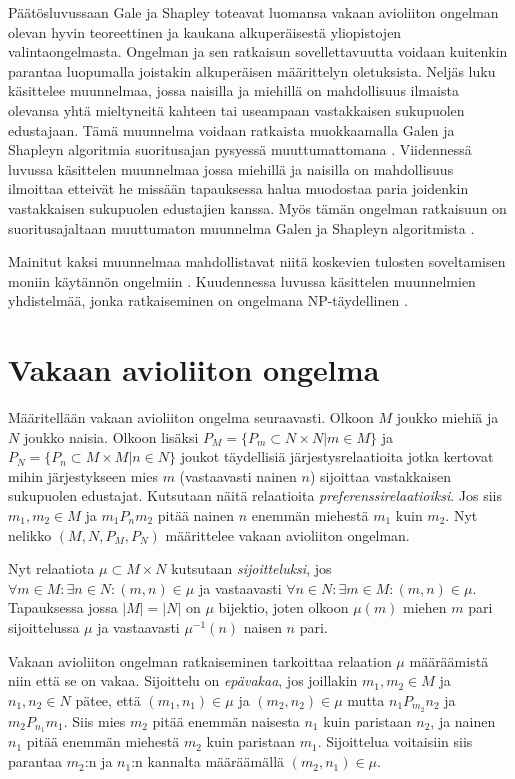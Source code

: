 \documentclass[gradu, twoside]{tktltiki}
\begin{document}
Päätösluvussaan Gale ja Shapley toteavat luomansa vakaan avioliiton
ongelman olevan hyvin teoreettinen ja kaukana alkuperäisestä
yliopistojen valintaongelmasta. Ongelman ja sen ratkaisun
sovellettavuutta voidaan kuitenkin parantaa luopumalla joistakin
alkuperäisen määrittelyn oletuksista. Neljäs luku käsittelee
muunnelmaa, jossa naisilla ja miehillä on mahdollisuus ilmaista
olevansa yhtä mieltyneitä kahteen tai useampaan vastakkaisen
sukupuolen edustajaan. Tämä muunnelma voidaan ratkaista muokkaamalla
Galen ja Shapleyn algoritmia suoritusajan pysyessä muuttumattomana
\cite{manlove02}. Viidennessä luvussa käsittelen muunnelmaa jossa
miehillä ja naisilla on mahdollisuus ilmoittaa etteivät he missään
tapauksessa halua muodostaa paria joidenkin vastakkaisen sukupuolen
edustajien kanssa. Myös tämän ongelman ratkaisuun on suoritusajaltaan
muuttumaton muunnelma Galen ja Shapleyn algoritmista
\cite{gusfield89}.

Mainitut kaksi muunnelmaa mahdollistavat niitä koskevien tulosten
soveltamisen moniin käytännön ongelmiin \cite{manlove02}. Kuudennessa
luvussa käsittelen muunnelmien yhdistelmää, jonka ratkaiseminen on
ongelmana NP-täydellinen \cite{manlove02}.

\section{Vakaan avioliiton ongelma}

Määritellään vakaan avioliiton ongelma seuraavasti. Olkoon $M$ joukko
miehiä ja $N$ joukko naisia. Olkoon lisäksi $P_M = \{P_m \subset N
\times N | m \in M\}$ ja $P_N = \{P_n \subset M \times M | n \in N\}$
joukot täydellisiä järjestysrelaatioita jotka kertovat mihin
järjestykseen mies $m$ (vastaavasti nainen $n$) sijoittaa vastakkaisen
sukupuolen edustajat. Kutsutaan näitä relaatioita
\emph{preferenssirelaatioiksi}. Jos siis $m_1,m_2 \in M$ ja
$m_1P_nm_2$ pitää nainen $n$ enemmän miehestä $m_1$ kuin $m_2$. Nyt
nelikko $(M, N, P_M, P_N)$ määrittelee vakaan avioliiton ongelman.

Nyt relaatiota $\mu \subset M \times N$ kutsutaan \emph{sijoitteluksi},
jos $\forall m \in M: \exists n \in N: (m, n) \in \mu$ ja vastaavasti
$\forall n \in N: \exists m \in M: (m, n) \in \mu$. Tapauksessa jossa
$|M| = |N|$ on $\mu$ bijektio, joten olkoon $\mu(m)$ miehen $m$ pari
sijoittelussa $\mu$ ja vastaavasti $\mu^{-1}(n)$ naisen $n$ pari.

Vakaan avioliiton ongelman ratkaiseminen tarkoittaa relaation $\mu$
määräämistä niin että se on vakaa. Sijoittelu on \emph{epävakaa}, jos
joillakin $m_1, m_2 \in M$ ja $n_1, n_2 \in N$ pätee, että $(m_1, n_1)
\in \mu$ ja $(m_2, n_2) \in \mu$ mutta $n_1P_{m_2}n_2$ ja
$m_2P_{n_1}m_1$. Siis mies $m_2$ pitää enemmän naisesta $n_1$ kuin
paristaan $n_2$, ja nainen $n_1$ pitää enemmän miehestä $m_2$ kuin
paristaan $m_1$. Sijoittelua voitaisiin siis parantaa $m_2$:n ja
$n_1$:n kannalta määräämällä $(m_2, n_1) \in \mu$.
\end{document}
